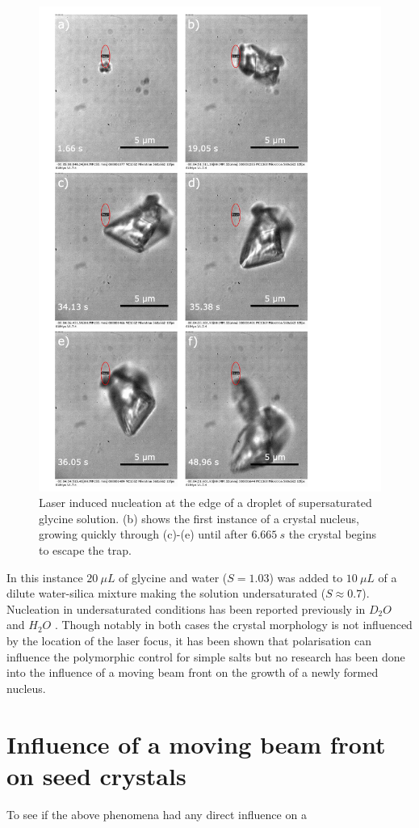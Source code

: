 \begin{figure}[h!]
	\centering
	\includegraphics[width=0.9\linewidth]{frames_eliptical_beam.pdf}
	\caption{Laser induced nucleation at the edge of a droplet of 
		supersaturated glycine solution. (b) shows the first instance 
		of a crystal nucleus, growing quickly through (c)-(e) until 
		after $6.665\ s$ the crystal begins to escape the trap.}
	\label{fig:eliptical_beam_1}
\end{figure}

In this instance $20\ \mu L$ of glycine and water ($S=1.03$) was added to $10\ \mu L$ 
of a dilute water-silica mixture making the solution undersaturated ($S\approx0.7$). 
Nucleation in undersaturated conditions has been reported previously in $D_2O$ 
\cite{Rungsimanon2010} and $H_2O$ \cite{Flannigan2023}. Though notably in both cases the
crystal morphology is not influenced by the location of the laser focus, it has been
shown that polarisation can influence the polymorphic control for simple salts 
\cite{Garetz1996, Garetz2002} but no research has been done into the influence of a 
moving beam front on the growth of a newly formed nucleus.  


\section{Influence of a moving beam front on seed crystals}
To see if the above phenomena had any direct influence on a  